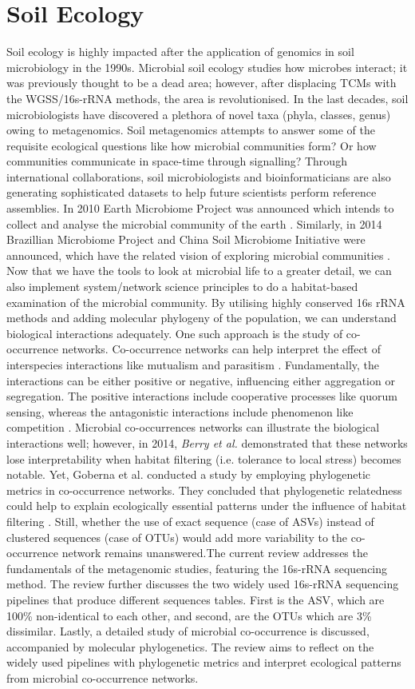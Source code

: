 \section{Soil Ecology}
Soil ecology is highly impacted after the application of genomics in soil microbiology in the 1990s. Microbial soil ecology studies how microbes interact; it was previously thought to be a dead area; however, after displacing TCMs with the WGSS/16s-rRNA methods, the area is revolutionised. In the last decades, soil microbiologists have discovered a plethora of novel taxa (phyla, classes, genus) owing to metagenomics. Soil metagenomics attempts to answer some of the requisite ecological questions like how microbial communities form? Or how communities communicate in space-time through signalling? Through international collaborations, soil microbiologists and bioinformaticians are also generating sophisticated datasets to help future scientists perform reference assemblies. In 2010 Earth Microbiome Project was announced which intends to collect and analyse the microbial community of the earth \cite{ref6}. Similarly, in 2014 Brazillian Microbiome Project and China Soil Microbiome Initiative were announced, which have the related vision of exploring microbial communities \cite{ref7}\cite{ref8}. Now that we have the tools to look at microbial life to a greater detail, we can also implement system/network science principles to do a habitat-based examination of the microbial community. By utilising highly conserved 16s rRNA methods and adding molecular phylogeny of the population, we can understand biological interactions adequately. One such approach is the study of co-occurrence networks. Co-occurrence networks can help interpret the effect of interspecies interactions like mutualism and parasitism \cite{ref9}. Fundamentally, the interactions can be either positive or negative, influencing either aggregation or segregation. The positive interactions include cooperative processes like quorum sensing, whereas the antagonistic interactions include phenomenon like competition \cite{ref9}. Microbial co-occurrences networks can illustrate the biological interactions well; however, in 2014, \emph{Berry et al.} demonstrated that these networks lose interpretability when habitat filtering (i.e. tolerance to local stress) becomes notable. Yet, Goberna et al. conducted a study by employing phylogenetic metrics in co-occurrence networks. They concluded that phylogenetic relatedness could help to explain ecologically essential patterns under the influence of habitat filtering \cite{ref10}. Still, whether the use of exact sequence (case of ASVs) instead of clustered sequences (case of OTUs) would add more variability to the co-occurrence network remains unanswered.\newline \newline The current review addresses the fundamentals of the metagenomic studies, featuring the 16s-rRNA sequencing method. The review further discusses the two widely used 16s-rRNA sequencing pipelines that produce different sequences tables. First is the ASV, which are 100\% non-identical to each other, and second, are the OTUs which are 3\% dissimilar. Lastly, a detailed study of microbial co-occurrence is discussed, accompanied by molecular phylogenetics. The review aims to reflect on the widely used pipelines with phylogenetic metrics and interpret ecological patterns from microbial co-occurrence networks.